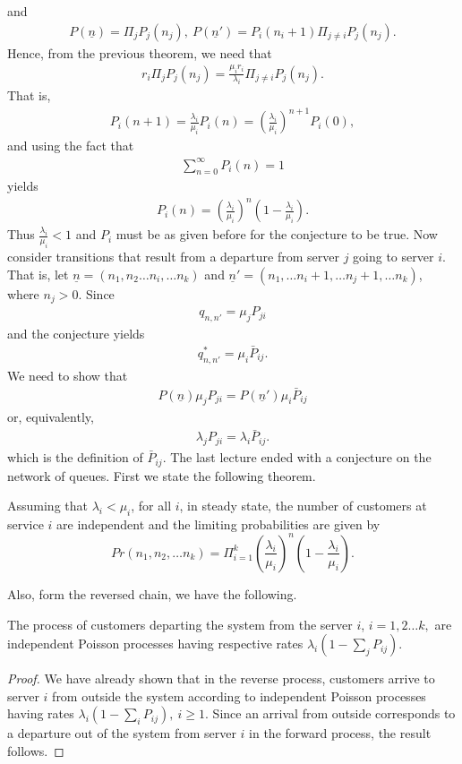 \documentclass[a4paper,10pt,english]{article}
\begin{document}
 and 
 \begin{align*}
 P(\underline{n})=\Pi_j P_j(n_j),~ P(\underline{n}')=P_i(n_i+1)\Pi_{j \neq i}P_j(n_j).
 \end{align*}
 Hence, from the previous theorem, we need that
 \begin{align*}
  r_i \Pi_j P_j(n_j)= \frac{\mu_i r_i}{\lambda_i}\Pi_{j \neq i}P_j(n_j).
 \end{align*} 
 That is,
 \begin{align*}
 P_i(n+1)= \frac{\lambda_i}{\mu_i}P_i(n)={(\frac{\lambda_i}{\mu_i})}^{n+1}P_i(0),
 \end{align*}
 and using the fact that 
 \begin{align*}
\sum_{n=0}^{\infty}P_i(n)=1
 \end{align*}
 yields 
 \begin{align*}
P_i(n) ={(\frac{\lambda_i}{\mu_i})}^n(1-\frac{\lambda_i}{\mu_i}).
\end{align*}
Thus $\frac{\lambda_i}{\mu_i}< 1$ and $P_i$ must be as given before for the conjecture to be true. Now consider transitions that result from a departure from server $j$ going to server $i$. That is, let $\underline{n}=(n_1,n_2 \hdots n_i, \hdots n_k)$ and $\underline{n}'=(n_1,\hdots n_i+1,\hdots n_j+1,\hdots n_k)$, where $n_j >0$. Since
\begin{align*}
q_{n,n'}=\mu_j P_{ji}
\end{align*}
and the conjecture yields
\begin{align*}
q_{n,n'}^*=\mu_i \bar{P}_{ij}.
\end{align*}
We need to show that 
\begin{align*}
P(\underline{n})\mu_j P_{ji}= P(\underline{n}')\mu_i \bar{P}_{ij}
\end{align*}
or, equivalently,
\begin{align*}
\lambda_j P_{ji}=\lambda_i \bar{P}_{ij}.
\end{align*}
which is the definition of $\bar{P}_{ij}$.
The last lecture ended with a conjecture on the network of queues. First we state the following theorem.
\begin{thm}
Assuming that $\lambda_i < \mu_i$, for all $i$, in steady state, the number of customers at service $i$ are independent and the limiting probabilities are given by
\begin{equation*}
Pr(n_1,n_2, \hdots n_k) = \Pi_{i=1}^{k}{(\frac{\lambda_i}{\mu_i})}^n (1-\frac{\lambda_i}{\mu_i}).
\end{equation*}
\end{thm}
Also, form the reversed chain, we have the following.
\begin{cor}
The process of customers departing the system from the server $i$, $i=1,2 \hdots k,$ are independent Poisson processes having respective rates $\lambda_i (1-\sum_j P_{ij} )$.
\end{cor}
\begin{proof}
We have already shown that in the reverse process, customers arrive to server $i$ from outside the system according to independent Poisson processes having rates $\lambda_i(1-\sum_{i}P_{ij}),~ i \geq 1$. Since an arrival from outside corresponds to a departure out of the system from server $i$ in the forward process, the result follows. 
\end{proof}
\end{document}
